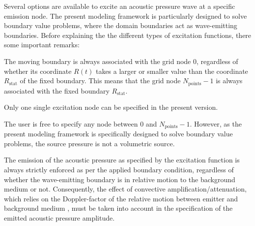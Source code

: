 Several options are available to excite an acoustic pressure wave at a specific emission node. The present modeling framework is particularly designed to solve boundary value problems, where the domain boundaries act as wave-emitting boundaries. Before explaining the the different types of excitation functions, there some important remarks:

\begin{compactitem}
\item The moving boundary is always associated with the grid node 0, regardless of whether its coordinate $R\left(t\right)$ takes a larger or smaller value than the coordinate $R_{\mathrm{stat}}$ of the fixed boundary. This means that the grid node $N_{\mathrm{points}}-1$ is always associated with the fixed boundary $R_{\mathrm{stat}}$.
\item Only one single excitation node can be specified in the present version.
\item The user is free to specify any node between $0$ and $N_{\mathrm{points}}-1$. However, as the present modeling framework is specifically designed to solve boundary value problems, the source pressure is not a volumetric source.
\item The emission of the acoustic pressure as specified by the excitation function is always strictly enforced as per the applied boundary condition, regardless of whether the wave-emitting boundary is in relative motion to the background medium or not. Consequently, the effect of convective amplification/attenuation, which relies on the Doppler-factor of the relative motion between emitter and background medium \citep{Ostashev_et_al_2005}, must be taken into account in the specification of the emitted acoustic pressure amplitude.
\end{compactitem}

